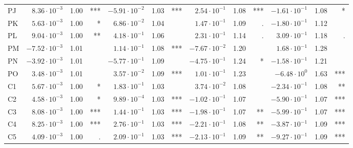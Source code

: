 \documentclass[11pt,letterpaper]{article}
\numberwithin{equation}{section}
\numberwithin{equation}{section}
\numberwithin{equation}{section}
\begin{document}
\begin{table}[!htb]
\begin{adjustwidth}{-2.5cm}{}
{\begin{tabular}{|l|rrr|rrr|rrr|rrr|}
PJ    & $8.36 \cdot 10^{-3}$       & 1.00       & ***          & $ -5.91 \cdot 10^{-2} $   & 1.03       & ***          & $2.54 \cdot 10^{-1} $        & 1.08       & ***          & $-1.61 \cdot 10^{-1} $          & 1.08       & *            \\
PK    & $5.63 \cdot 10^{-3}$       & 1.00       & *            & $ 6.86 \cdot 10^{-2} $   & 1.04       &              & $1.47 \cdot 10^{-1} $       & 1.09       & .            & $-1.80 \cdot 10^{-1} $      & 1.12       &              \\
PL    & $9.04 \cdot 10^{-3}$     & 1.00       & **           & $ 4.18 \cdot 10^{-1} $   & 1.06       &              & $2.31 \cdot 10^{-1} $          & 1.14       & .            & $3.09 \cdot 10^{-1} $          & 1.18       & .            \\
PM    & $-7.52 \cdot 10^{-3} $  & 1.01       &              & $ 1.14 \cdot 10^{-1} $        & 1.08       & ***          & $-7.67 \cdot 10^{-2} $        & 1.20       &              & $1.68 \cdot 10^{-1} $       & 1.28       &              \\
PN    & $-3.92 \cdot 10^{-3} $    & 1.01       &              &  $ -5.77 \cdot 10^{-1} $   & 1.09       &              & $-4.75 \cdot 10^{-1} $       & 1.24       & *            & $-1.58 \cdot 10^{-1} $      & 1.21       &              \\
PO   & $3.48 \cdot 10^{-3} $    & 1.01       &              & $ 3.57 \cdot 10^{-2} $        & 1.09       & ***          & $1.01 \cdot 10^{-1} $    & 1.23       &              & $-6.48 \cdot 10^{0} $     & 1.63       & ***          \\
C1   & $5.67 \cdot 10^{-3} $  & 1.00       & *            & $ 1.83 \cdot 10^{-1} $        & 1.03       &              & $3.74 \cdot 10^{-2} $         & 1.08       &              & $-2.34 \cdot 10^{-1} $       & 1.08       & **           \\
C2   & $4.58 \cdot 10^{-3} $    & 1.00       & *            &$ 9.89 \cdot 10^{-4} $   & 1.03       & ***          & $-1.02 \cdot 10^{-1} $      & 1.07       &              &  $-5.90 \cdot 10^{-1} $      & 1.07       & ***          \\
C3  & $8.08 \cdot 10^{-3} $   & 1.00       & ***          & $ 1.44 \cdot 10^{-1} $        & 1.03       & ***          & $-1.98 \cdot 10^{-1} $    & 1.07       & **           &  $-5.99 \cdot 10^{-1} $       & 1.07       & ***          \\
C4  & $8.25 \cdot 10^{-3} $  & 1.00       & ***          &$ 2.76 \cdot 10^{-1} $      & 1.03       & ***          &  $-2.21 \cdot 10^{-1} $       & 1.08       & **           & $-3.87 \cdot 10^{-1} $      & 1.09       & ***          \\
C5 & $4.09 \cdot 10^{-3} $& 1.00       & .            & $ 2.09 \cdot 10^{-1} $          & 1.03       & ***          & $-2.13 \cdot 10^{-1} $    & 1.09       & **           & $-9.27 \cdot 10^{-1} $       & 1.09       & ***         \\
\hline\hline
\end{tabular}
}
 \end{adjustwidth}
\end{table}
\end{document}
